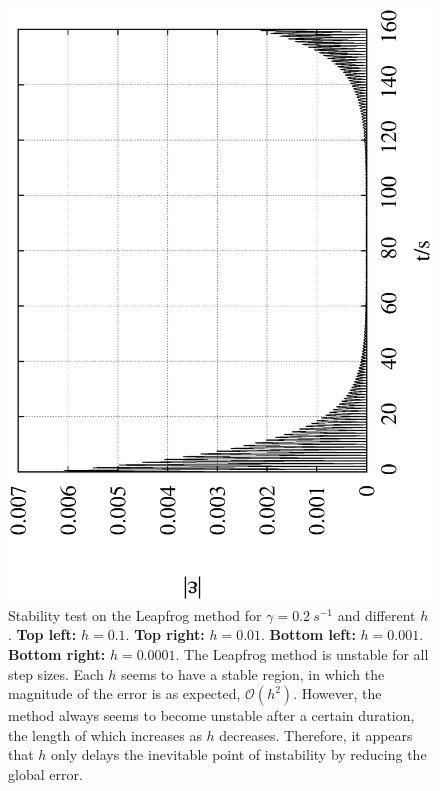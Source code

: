 \documentclass[10pt,a4paper]{article}
\begin{document}
\begin{figure}[h!]
\begin{center}
\includegraphics[scale = 0.3, angle =-90]{./Leapfrog_0.0001_6000000_0.2.eps}
\caption{Stability test on the Leapfrog method for $\gamma = 0.2\:s^{-1}$ and different $h$.  \textbf{Top left: } $h=0.1$. \textbf{Top right: } $h=0.01$. \textbf{Bottom left: }$h=0.001$. \textbf{Bottom right: }$h=0.0001$. The Leapfrog method is unstable for all step sizes. Each $h$ seems to have a stable region, in which the magnitude of the error is as expected, $\mathcal{O}(h^2)$. However, the method always seems to become unstable after a certain duration, the length of which increases as $h$ decreases. Therefore, it appears that $h$ only delays the inevitable point of instability by reducing the global error.}
\label{fig:LeapStability}
\end{center}
\end{figure}
\end{document}
